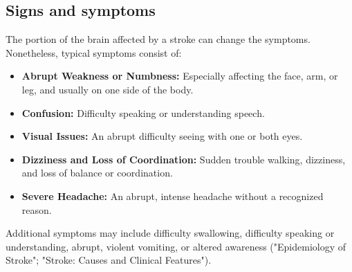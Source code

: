 \subsection{Signs and symptoms}
\label{sec:signsandsymptoms}
The portion of the brain affected by a stroke can change the symptoms. Nonetheless, typical symptoms consist of:
\begin{itemize}
  \item \textbf{Abrupt Weakness or Numbness:} Especially affecting the face, arm, or leg, and usually on one side of the body.
  \item \textbf{Confusion:} Difficulty speaking or understanding speech.
  \item \textbf{Visual Issues:} An abrupt difficulty seeing with one or both eyes.
  \item \textbf{Dizziness and Loss of Coordination:} Sudden trouble walking, dizziness, and loss of balance or coordination.
  \item \textbf{Severe Headache:} An abrupt, intense headache without a recognized reason.
\end{itemize}
Additional symptoms may include difficulty swallowing, difficulty speaking or understanding, abrupt, violent vomiting, or altered awareness ("Epidemiology of Stroke"; "Stroke: Causes and Clinical Features").

